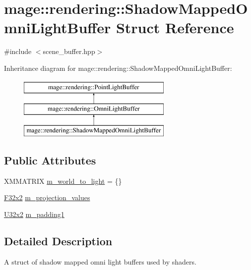 \hypertarget{structmage_1_1rendering_1_1_shadow_mapped_omni_light_buffer}{}\section{mage\+:\+:rendering\+:\+:Shadow\+Mapped\+Omni\+Light\+Buffer Struct Reference}
\label{structmage_1_1rendering_1_1_shadow_mapped_omni_light_buffer}


{\ttfamily \#include $<$scene\+\_\+buffer.\+hpp$>$}

Inheritance diagram for mage\+:\+:rendering\+:\+:Shadow\+Mapped\+Omni\+Light\+Buffer\+:\begin{figure}[H]
\begin{center}
\leavevmode
\includegraphics[height=3.000000cm]{structmage_1_1rendering_1_1_shadow_mapped_omni_light_buffer}
\end{center}
\end{figure}
\subsection*{Public Attributes}
\begin{DoxyCompactItemize}
\item 
X\+M\+M\+A\+T\+R\+IX \mbox{\hyperlink{structmage_1_1rendering_1_1_shadow_mapped_omni_light_buffer_a6ad3f982000ca1d68c3897589aa89798}{m\+\_\+world\+\_\+to\+\_\+light}} = \{\}
\item 
\mbox{\hyperlink{namespacemage_aee4759dedc8def6c6dec26b5c7eddf29}{F32x2}} \mbox{\hyperlink{structmage_1_1rendering_1_1_shadow_mapped_omni_light_buffer_a29016735134bb44c6c6f0d52fbf9ef2c}{m\+\_\+projection\+\_\+values}}
\item 
\mbox{\hyperlink{namespacemage_ae5e7ccf8a1785baaacf57b3a0f4324e2}{U32x2}} \mbox{\hyperlink{structmage_1_1rendering_1_1_shadow_mapped_omni_light_buffer_acbf52ed596dcc885a77727c2787e4eb0}{m\+\_\+padding1}}
\end{DoxyCompactItemize}


\subsection{Detailed Description}
A struct of shadow mapped omni light buffers used by shaders. 

